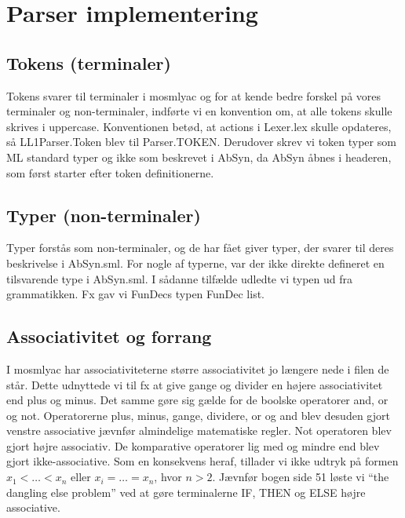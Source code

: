 \documentclass[11pt,a4paper]{article}
\begin{document}
\section*{Parser implementering}
\label{sec:implementation}
\subsection*{Tokens (terminaler)}
Tokens svarer til terminaler i mosmlyac og for at kende bedre forskel
på vores terminaler og non-terminaler, indførte vi en konvention om,
at alle tokens skulle skrives i uppercase. Konventionen betød, at
actions i Lexer.lex skulle opdateres, så LL1Parser.Token blev til
Parser.TOKEN. Derudover skrev vi token typer som ML standard
typer og ikke som beskrevet i AbSyn, da AbSyn åbnes i headeren,
som først starter efter token definitionerne.
\subsection*{Typer (non-terminaler)}
Typer forstås som non-terminaler, og de har fået giver typer, der
svarer til deres beskrivelse i AbSyn.sml. For nogle af typerne,
var der ikke direkte defineret en tilsvarende type i AbSyn.sml.
I sådanne tilfælde udledte vi typen ud fra grammatikken. Fx gav
vi FunDecs typen FunDec list.
\subsection*{Associativitet og forrang}
I mosmlyac har associativiteterne større associativitet jo længere
nede i filen de står. Dette udnyttede vi til fx at give gange og divider
en højere associativitet end plus og minus. Det samme gøre sig gælde for
de boolske operatorer and, or og not. Operatorerne plus, minus, gange,
dividere, or og and blev desuden gjort venstre associative jævnfør
almindelige matematiske regler. Not operatoren blev gjort højre
associativ. De komparative operatorer lig med og mindre end blev gjort
ikke-associative. Som en konsekvens heraf, tillader vi ikke udtryk på
formen $x_{1} < \dots < x_{n}$ eller $x_{i} = \dots = x_{n}$, hvor
$n > 2$. Jævnfør bogen side 51 løste vi ``the dangling else problem''
ved at gøre terminalerne IF, THEN og ELSE højre associative.
\end{document}
